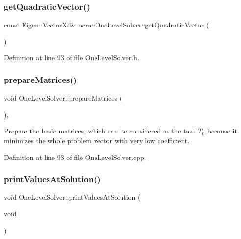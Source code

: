 \subsubsection{\texorpdfstring{get\+Quadratic\+Vector()}{getQuadraticVector()}}
{\footnotesize\ttfamily const Eigen\+::\+Vector\+Xd\& ocra\+::\+One\+Level\+Solver\+::get\+Quadratic\+Vector (\begin{DoxyParamCaption}{ }\end{DoxyParamCaption})\hspace{0.3cm}{\ttfamily [inline]}}



Definition at line 93 of file One\+Level\+Solver.\+h.

\hypertarget{classocra_1_1OneLevelSolver_a5be8402f863a2ea3ce22e815bf46281c}{}\label{classocra_1_1OneLevelSolver_a5be8402f863a2ea3ce22e815bf46281c} 
\subsubsection{\texorpdfstring{prepare\+Matrices()}{prepareMatrices()}}
{\footnotesize\ttfamily void One\+Level\+Solver\+::prepare\+Matrices (\begin{DoxyParamCaption}{ }\end{DoxyParamCaption})\hspace{0.3cm}{\ttfamily [protected]}, {\ttfamily [virtual]}}

Prepare the basic matrices, which can be considered as the task $ T_0 $ because it minimizes the whole problem vector with very low coefficient. 

Definition at line 93 of file One\+Level\+Solver.\+cpp.

\hypertarget{classocra_1_1OneLevelSolver_a90751a818854e6b91342f209fd5a0fd2}{}\label{classocra_1_1OneLevelSolver_a90751a818854e6b91342f209fd5a0fd2} 
\subsubsection{\texorpdfstring{print\+Values\+At\+Solution()}{printValuesAtSolution()}}
{\footnotesize\ttfamily void One\+Level\+Solver\+::print\+Values\+At\+Solution (\begin{DoxyParamCaption}\item[{void}]{ }\end{DoxyParamCaption})\hspace{0.3cm}{\ttfamily [virtual]}}

